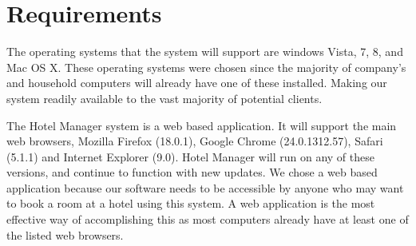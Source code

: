 \section{Requirements}
The operating systems that the system will support are windows Vista, 7, 8, and Mac OS X. These operating systems were chosen since the majority of company's and household computers will 
already have one of these installed. Making our system readily available to the vast
majority of potential clients. 

The Hotel Manager system is a web based application.  It will support the main web browsers, Mozilla 
Firefox (18.0.1), Google Chrome (24.0.1312.57), Safari (5.1.1) and Internet Explorer (9.0).  Hotel 
Manager will run on any of these versions, and continue to function with new updates.  We chose 
a web based application because our software needs to be accessible by anyone who may want to book
a room at a hotel using this system. A web application is the most effective way of accomplishing 
this as most computers already have at least one of the listed web browsers. 
